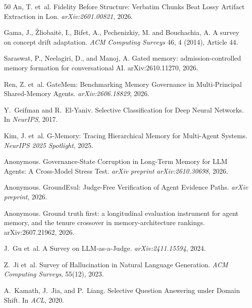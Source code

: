 \documentclass[sigconf,nonacm]{acmart}
\begin{document}
\begin{thebibliography}{50}
An, T. et~al.
\newblock Fidelity Before Structure: Verbatim Chunks Beat Lossy Artifact Extraction in Lon. \newblock \emph{arXiv:2601.00821}, 2026.

Gama, J., Žliobaitė, I., Bifet, A., Pechenizkiy, M. and Bouchachia, A. A survey on concept drift adaptation. \emph{ACM Computing Surveys} 46, 4 (2014), Article 44.

Saraswat, P., Neelagiri, D., and Manoj, A. Gated memory: admission-controlled memory
formation for conversational AI. arXiv:2610.11270, 2026.

Ren, Z. et~al.
\newblock GateMem: Benchmarking Memory Governance in Multi-Principal Shared-Memory Agents. \newblock \emph{arXiv:2606.18829}, 2026.

Y.~Geifman and R.~El-Yaniv.
\newblock Selective Classification for Deep Neural Networks.
\newblock In \emph{NeurIPS}, 2017.

Kim, J. et~al.
\newblock G-Memory: Tracing Hierarchical Memory for Multi-Agent Systems.
\newblock \emph{NeurIPS 2025 Spotlight}, 2025.

Anonymous.
\newblock Governance-State Corruption in Long-Term Memory for LLM Agents: A Cross-Model Stress Test.
\newblock \emph{arXiv preprint arXiv:2610.30698}, 2026.

Anonymous.
\newblock GroundEval: Judge-Free Verification of Agent Evidence Paths.
\newblock \emph{arXiv preprint}, 2026.

Anonymous. Ground truth first: a longitudinal evaluation instrument for agent
memory, and the tenure crossover in memory-architecture rankings.
arXiv:2607.21962, 2026.

J.~Gu et~al.
\newblock A Survey on LLM-as-a-Judge.
\newblock \emph{arXiv:2411.15594}, 2024.

Z.~Ji et~al.
\newblock Survey of Hallucination in Natural Language Generation.
\newblock \emph{ACM Computing Surveys}, 55(12), 2023.

A.~Kamath, J.~Jia, and P.~Liang.
\newblock Selective Question Answering under Domain Shift.
\newblock In \emph{ACL}, 2020.


\end{thebibliography}
\end{document}
